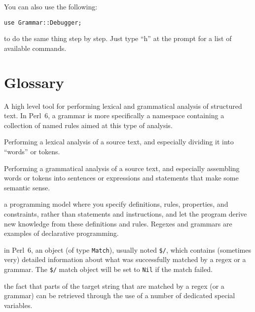 You can also use the following:

\begin{verbatim}
use Grammar::Debugger;
\end{verbatim}

to do the same thing step by step. Just type ``h'' at the 
prompt for a list of available commands.


\section{Glossary}

\begin{description}

\item[grammar:] A high level tool for performing lexical and 
grammatical analysis of structured text. In Perl~6, 
a grammar is more specifically a namespace containing a 
collection of named rules aimed at this type of analysis.

\item[lexing:] Performing a lexical analysis of a source text, and especially dividing it into ``words'' or tokens.

\item[parsing:] Performing a grammatical analysis of a source text, 
and especially assembling words or tokens into sentences or 
expressions and statements that make some semantic sense. 

\item[declarative programming:] a programming model where you 
specify definitions, rules, properties, and constraints, rather 
than statements and instructions, and let the program derive 
new knowledge from these definitions and rules. Regexes and 
grammars are examples of declarative programming.

\item[match object:] in Perl~6, an object (of type {\tt Match}), 
usually noted \verb'$/', which contains (sometimes very) 
detailed information about what was successfully matched 
by a regex or a grammar. The \verb'$/' match object will be 
set to {\tt Nil} if the match failed.

\item[capture:] the fact that parts of the target string that 
are matched by a regex (or a grammar) can be retrieved through 
the use of a number of dedicated special variables.


\end{description}
